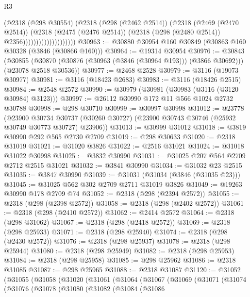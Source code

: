 \begin{lexlean}{R3}
\begin{coremodule}
                                  (@2318
                                    (@298 @30554)
                                    (@2318
                                      (@298 (@2462 @2514))
                                      (@2318
                                        (@2469 (@2470 @2514))
                                        (@2318
                                          (@2475 (@2476 @2514))
                                          (@2318 (@298 (@2480 @2514)) @2356))))))))))))))))))))
@30963 := @30880 @30954 @160 @30849 (@30863 @160 @30328 (@3846 (@30866 @160)))
@30964 := @19314 @30954
@30976 := @30843
    (@30855 (@30870 (@30876 (@30963 (@3846 (@30964 @193))) (@3866 @30692))) (@23078 @2518 @30536))
@30977 := @2468 @2528
@30979 := @3116 (@19073 @30977)
@30981 := @3116 (@18423 @2683)
@30983 := @3116 (@18426 @2515)
@30984 := @2548 @2572
@30990 := @30979 (@30981 (@30983 (@3116 (@3120 @30984) @3123)))
@30997 := @26112 @30990 @172 @11 @566 @1024 @2732 @30788
@30998 := @298 @30710
@30999 := @30997 @30998
@31012 := @23778
    (@23900
      @30734
      @30737
      (@30260 @30727)
      (@23900 @30743 @30746 (@25932 @30749 @30773 @30727) @23906))
@31013 := @30999 @31012
@31018 := @3819 @30990 @292 @565 @2730 @2709
@31019 := @298 @30633
@31020 := @2318 @31019
@31021 := @31020 @3826
@31022 := @2516 @31021
@31024 := @31018 @31022 @30998
@31025 := @3832 @30990
@31031 := @31025 @207 @564 @2709 @2712 @2515 @31021
@31032 := @3841 @30990
@31034 := @31032 @23 @2515
@31035 := @3847 @30990
@31039 := @31031 (@31034 (@3846 (@31035 @23)))
@31045 := @31025 @562 @302 @2709 @2711 @31019 @3826
@31049 := @19263 @30990 @178 @2709 @74
@31052 := @2318 (@298 (@2394 @2572))
@31055 := @2318 (@298 (@2398 @2572))
@31058 := @2318 (@298 (@2402 @2572))
@31061 := @2318 (@298 (@2410 @2572))
@31062 := @2414 @2572
@31064 := @2318 (@298 @31062)
@31067 := @2318 (@298 (@2418 @2572))
@31069 := @2318 (@298 @25933)
@31071 := @2318 (@298 @25940)
@31074 := @2318 (@298 (@2430 @2572))
@31076 := @2318 (@298 @25937)
@31078 := @2318 (@298 @25944)
@31080 := @2318 (@298 @25949)
@31082 := @2318 (@298 @25953)
@31084 := @2318 (@298 @25958)
@31085 := @298 @25962
@31086 := @2318 @31085
@31087 := @298 @25965
@31088 := @2318 @31087
@31120 := @31052
    (@31055
      (@31058
        (@31020
          (@31061
            (@31064
              (@31067
                (@31069
                  (@31071
                    (@31074
                      (@31076
                        (@31078
                          (@31080
                            (@31082
                              (@31084
                                (@31086

\end{coremodule}
\end{lexlean}
